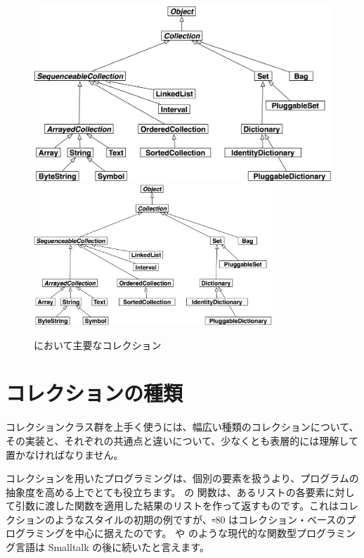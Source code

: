 \documentclass[a4paper,10pt,twoside]{book}
\begin{document}
\begin{figure}
\begin{center}
\ifluluelse
	{\includegraphics[width=\textwidth]{CollectionHierarchy}}
	{\includegraphics[width=0.8\textwidth]{CollectionHierarchy}}
\caption{\pharo において主要なコレクション}
\end{center}
\end{figure}

\section{コレクションの種類}

コレクションクラス群を上手く使うには、幅広い種類のコレクションについて、その実装と、それぞれの共通点と違いについて、少なくとも表層的には理解して置かなければなりません。

コレクションを用いたプログラミングは、個別の要素を扱うより、プログラムの抽象度を高める上でとても役立ちます。
 の  関数は、あるリストの各要素に対して引数に渡した関数を適用した結果のリストを作って返すものです。これはコレクションのようなスタイルの初期の例ですが、\st-80 はコレクション・ベースのプログラミングを中心に据えたのです。 や  のような現代的な関数型プログラミング言語は Smalltalk の後に続いたと言えます。
\end{document}
